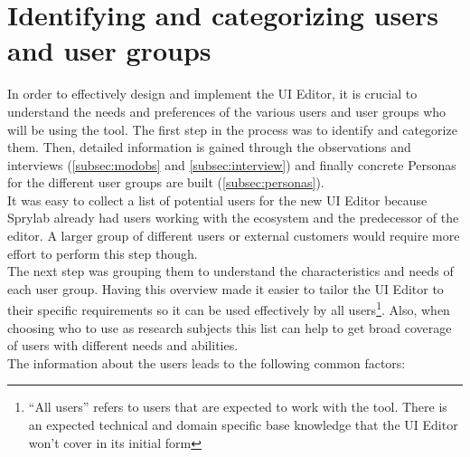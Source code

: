 \section{Identifying and categorizing users and user groups}
\label{sec:user-groups}
In order to effectively design and implement the UI Editor, it is crucial to understand the needs and preferences of the various users and user groups who will be using the tool.
The first step in the process was to identify and categorize them.
Then, detailed information is gained through the observations and interviews (\ref{subsec:modobs} and \ref{subsec:interview}) and finally concrete Personas for the different user groups are built (\ref{subsec:personas}).
\\
It was easy to collect a list of potential users for the new UI Editor because Sprylab already had users working with the ecosystem and the predecessor of the editor.
A larger group of different users or external customers would require more effort to perform this step though.
\\
The next step was grouping them to understand the characteristics and needs of each user group.
Having this overview made it easier to tailor the UI Editor to their specific requirements so it can be used effectively by all users\footnote{``All users'' refers to users that are expected to work with the tool. There is an expected technical and domain specific base knowledge that the UI Editor won't cover in its initial form}.
Also, when choosing who to use as research subjects this list can help to get broad coverage of users with different needs and abilities.
\\
The information about the users leads to the following common factors:
